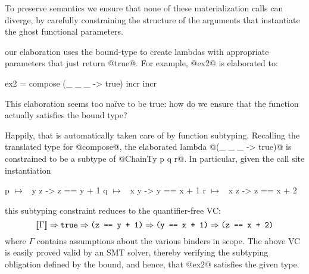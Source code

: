 To preserve semantics we ensure that none of these materialization
calls can diverge, by carefully constraining the structure of
the arguments that instantiate the ghost functional parameters.

 our elaboration uses
the bound-type to create lambdas with appropriate parameters
that just return @true@. For example, @ex2@ is elaborated to:
%
\begin{code}
  ex2 = compose (\_ _ _ -> true) incr incr
\end{code}
%
This elaboration seems too na\"ive to be true: how do we
ensure that the function actually satisfies the bound type?

Happily, that is automatically taken care of by function subtyping.
%
Recalling the translated type for @compose@, the elaborated lambda
@(\_ _ _ ->  true)@ is constrained to be a subtype of @ChainTy p q r@.
%
In particular, given the call site instantiation
%
\begin{mcode}
  p $\mapsto$ \ y z -> z == y + 1
  q $\mapsto$ \ x y -> y == x + 1
  r $\mapsto$ \ x z -> z == x + 2
\end{mcode}
%
this subtyping constraint reduces to the quantifier-free VC:
%
\begin{equation}
[\![\Gamma]\!]
  \Rightarrow \mathtt{true}
  \Rightarrow \texttt{(z == y + 1)}
   \Rightarrow \texttt{(y == x + 1)}\notag
   \Rightarrow \texttt{(z == x + 2)}  \label{vc:bounded:ex2}
\end{equation}
%
%
where $\Gamma$ contains assumptions about the various binders in
scope.
%
The above VC is easily proved valid by an SMT solver, thereby
verifying the subtyping obligation defined by the bound, and hence,
that @ex2@ satisfies the given type.
